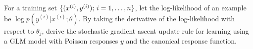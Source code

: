 \item {} For a training set $\{(x^{(i)}, y^{(i)});\, i=1,\ldots,{n}\}$, let the log-likelihood of an example be $\log p(y^{(i)} \vert  x^{(i)}; \theta)$. By taking the derivative of the log-likelihood with respect to $\theta_j$, derive the stochastic gradient ascent update rule for learning using a GLM model with Poisson responses $y$ and the canonical response function.\\

